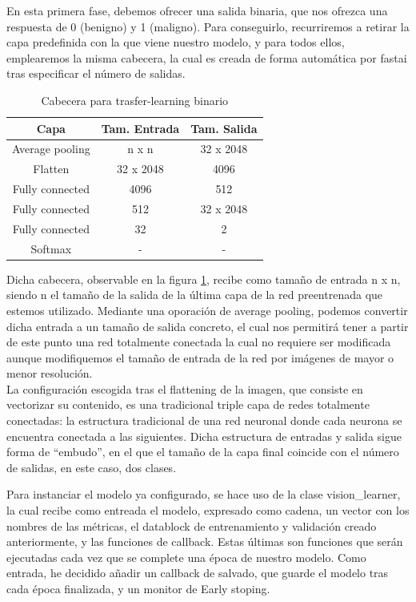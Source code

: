 En esta primera fase, debemos ofrecer una salida binaria, que nos ofrezca una respuesta de 0 (benigno) y 1 (maligno). Para conseguirlo, recurriremos a retirar la capa predefinida con la que viene nuestro modelo, y para todos ellos, emplearemos la misma cabecera, la cual es creada de forma automática por fastai tras especificar el número de salidas.

\begin{table}[H]
	\centering
	\begin{tabular}{|c|c|c|}
		\hline
		\textbf{Capa} & \textbf{Tam. Entrada} & \textbf{Tam. Salida} \\ \hline
		Average pooling & n x n & 32 x 2048 \\ \hline
		Flatten & 32 x 2048 & 4096 \\ \hline
		Fully connected & 4096 & 512 \\ \hline
		Fully connected & 512 & 32 x 2048 \\ \hline
		Fully connected & 32 & 2 \\ \hline
		Softmax & - & - \\ \hline
	\end{tabular}
		\caption{Cabecera para trasfer-learning binario}
	\label{header}
\end{table}

Dicha cabecera, observable en la figura \ref{header}, recibe como tamaño de entrada n x n, siendo n el tamaño de la salida de la última capa de la red preentrenada que estemos utilizado. Mediante una oporación de average pooling, podemos convertir dicha entrada a un tamaño de salida concreto, el cual nos permitirá tener a partir de este punto una red totalmente conectada la cual no requiere ser modificada aunque modifiquemos el tamaño de entrada de la red por imágenes de mayor o menor resolución. \\

La configuración escogida tras el flattening de la imagen, que consiste en vectorizar su contenido, es una tradicional triple capa de redes totalmente conectadas: la estructura tradicional de una red neuronal donde cada neurona se encuentra conectada a las siguientes. Dicha estructura de entradas y salida sigue forma de ``embudo'', en el que el tamaño de la capa final coincide con el  número de salidas, en este caso, dos clases.

Para instanciar el modelo ya configurado, se hace uso de la clase vision\_learner, la cual recibe como entreada el modelo, expresado como cadena, un vector con los nombres de las métricas, el datablock de entrenamiento y validación creado anteriormente, y las funciones de callback. Estas últimas son funciones que serán ejecutadas cada vez que se complete una época de nuestro modelo. Como entrada, he decidido añadir un callback de salvado, que guarde el modelo tras cada época finalizada, y un monitor de Early stoping.


